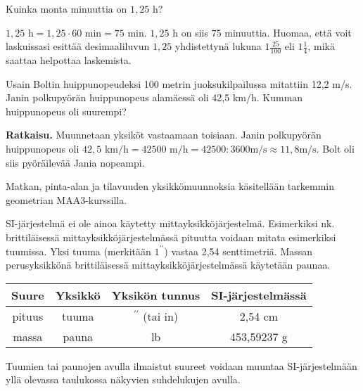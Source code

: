 \begin{esimerkki}
Kuinka monta minuuttia on $1,25$ h?

\begin{esimratk}
$1,25 \text{ h} = 1,25 \cdot 60 \text{ min} = 75 \text{ min}$. $1,25$ h on siis $75$ minuuttia. Huomaa, että voit laskuissasi esittää desimaaliluvun $1,25$ yhdistettynä lukuna $1 \frac{25}{100}$ eli $1 \frac{1}{4}$, mikä saattaa helpottaa laskemista.
\end{esimratk}
\end{esimerkki}


\begin{esimerkki}
Usain Boltin huippunopeudeksi 100 metrin juoksukilpailussa mitattiin 12,2 m/s. Janin polkupyörän huippunopeus alamäessä oli 42,5 km/h. Kumman huippunopeus oli suurempi?

\textbf{Ratkaisu.}
Muunnetaan yksiköt vastaamaan toisiaan. Janin polkupyörän huippunopeus oli $42,5 \textrm{ km/h} = 42500 \textrm{ m/h} = 42500 : 3600 \textrm{m/s} \approx 11,8 \textrm{m/s}$.
Bolt oli siis pyöräilevää Jania nopeampi.
\end{esimerkki}

Matkan, pinta-alan ja tilavuuden yksikkömuunnoksia käsitellään tarkemmin geometrian MAA3-kurssilla. 

SI-järjestelmä ei ole ainoa käytetty mittayksikköjärjestelmä. Esimerkiksi nk. brittiläisessä mittayksikköjärjestelmässä pituutta voidaan mitata esimerkiksi tuumissa. Yksi tuuma (merkitään $1^{\prime \prime}$) vastaa 2,54 senttimetriä. Massan perusyksikkönä brittiläisessä mittayksikköjärjestelmässä käytetään paunaa.

\begin{tabular}{c|c|c|c}
Suure & Yksikkö & Yksikön tunnus & SI-järjestelmässä\\
\hline
pituus & tuuma & $^{\prime \prime}$ (tai in) & 2,54 cm \\
massa & pauna & lb & 453,59237 g \\
\end{tabular}

Tuumien tai paunojen avulla ilmaistut suureet voidaan muuntaa SI-järjestelmään yllä olevassa taulukossa näkyvien suhdelukujen avulla.

